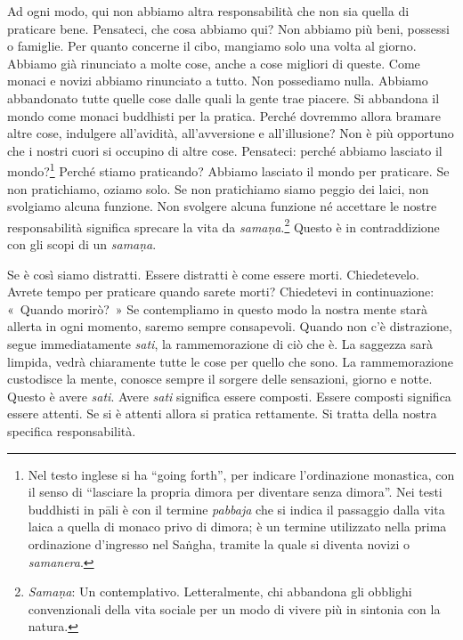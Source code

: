 Ad ogni modo, qui non abbiamo altra responsabilità che non sia quella di
praticare bene. Pensateci, che cosa abbiamo qui? Non abbiamo più beni,
possessi o famiglie. Per quanto concerne il cibo, mangiamo solo una
volta al giorno. Abbiamo già rinunciato a molte cose, anche a cose
migliori di queste. Come monaci e novizi abbiamo rinunciato a tutto. Non
possediamo nulla. Abbiamo abbandonato tutte quelle cose dalle quali la
gente trae piacere. Si abbandona il mondo come monaci buddhisti per la
pratica. Perché dovremmo allora bramare altre cose, indulgere
all'avidità, all'avversione e all'illusione? Non è più opportuno che i
nostri cuori si occupino di altre cose. Pensateci: perché abbiamo
lasciato il mondo?\footnote{%
  Nel testo inglese si ha ``going forth'', per indicare l'ordinazione
  monastica, con il senso di ``lasciare la propria dimora per diventare
  senza dimora''. Nei testi buddhisti in pāli è con il termine
  \emph{pabbaja} che si indica il passaggio dalla vita laica a quella di
  monaco privo di dimora; è un termine utilizzato nella prima
  ordinazione d'ingresso nel Saṅgha, tramite la quale si diventa novizi
  o \emph{samanera}.}
Perché stiamo praticando? Abbiamo lasciato il mondo per
praticare. Se non pratichiamo, oziamo solo. Se non pratichiamo siamo
peggio dei laici, non svolgiamo alcuna funzione. Non svolgere alcuna
funzione né accettare le nostre responsabilità significa sprecare la
vita da \emph{samaṇa}.\footnote{\emph{Samaṇa}: Un contemplativo.
  Letteralmente, chi abbandona gli obblighi convenzionali della vita
  sociale per un modo di vivere più in sintonia con la natura.} Questo è
in contraddizione con gli scopi di un \emph{samaṇa}.

Se è così siamo distratti. Essere distratti è come essere morti.
Chiedetevelo. Avrete tempo per praticare quando sarete morti? Chiedetevi
in continuazione: «~Quando morirò?~» Se contempliamo in questo modo la
nostra mente starà allerta in ogni momento, saremo sempre consapevoli.
Quando non c'è distrazione, segue immediatamente \emph{sati}, la
rammemorazione di ciò che è. La saggezza sarà limpida, vedrà chiaramente
tutte le cose per quello che sono. La rammemorazione custodisce la
mente, conosce sempre il sorgere delle sensazioni, giorno e notte.
Questo è avere \emph{sati}. Avere \emph{sati} significa essere composti.
Essere composti significa essere attenti. Se si è attenti allora si
pratica rettamente. Si tratta della nostra specifica responsabilità.

